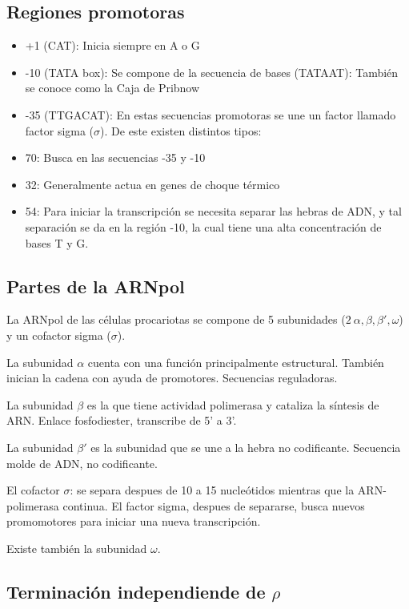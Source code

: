 \subsection{Regiones promotoras}

\begin{itemize}
    \item +1 (CAT): Inicia siempre en A o G
    \item -10 (TATA box): Se compone de la secuencia de bases (TATAAT): También se conoce como la Caja de Pribnow
    \item -35 (TTGACAT): En estas secuencias promotoras se une un factor llamado factor sigma ($\sigma$). De este existen distintos tipos:
    \item 70: Busca en las secuencias -35 y -10
    \item 32: Generalmente actua en genes de choque térmico
    \item 54: Para iniciar la transcripción se necesita separar las hebras de ADN, y tal separación se da en la región -10, la cual tiene una alta concentración de bases T y G.
\end{itemize}

\subsection{Partes de la ARNpol}

La ARNpol de las células procariotas se compone de 5 subunidades ($2 \ \alpha, \beta , \beta ', \omega$) y un cofactor sigma ($\sigma$).

La subunidad $\alpha$ cuenta con una función principalmente estructural. También inician la cadena con ayuda de promotores. Secuencias reguladoras.

La subunidad $\beta$ es la que tiene actividad polimerasa y cataliza la síntesis de ARN. Enlace fosfodiester, transcribe de 5' a 3'.

La subunidad $\beta '$ es la subunidad que se une a la hebra no codificante. Secuencia molde de ADN, no codificante.

El cofactor $\sigma$: se separa despues de 10 a 15 nucleótidos mientras que la ARN-polimerasa continua. El factor sigma, despues de separarse, busca nuevos promomotores para iniciar una nueva transcripción.

Existe también la subunidad $\omega$.

\subsection{Terminación independiende de $\rho$}

